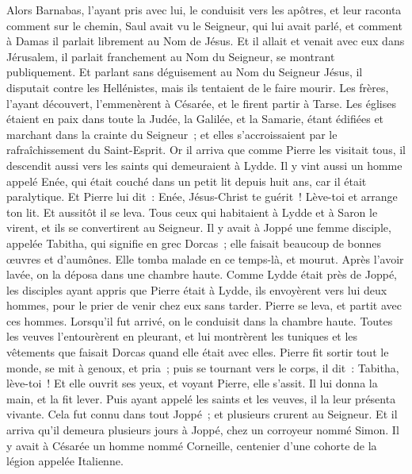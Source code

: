 \begin{multicols}{2}
Alors Barnabas, l'ayant pris avec lui, le conduisit vers les apôtres, et leur raconta comment sur le chemin, Saul avait vu le Seigneur, qui lui avait parlé, et comment à Damas il parlait librement au Nom de Jésus.
Et il allait et venait avec eux dans Jérusalem, il parlait franchement au Nom du Seigneur, se montrant publiquement.
Et parlant sans déguisement au Nom du Seigneur Jésus, il disputait contre les Hellénistes, mais ils tentaient de le faire mourir.
Les frères, l'ayant découvert, l'emmenèrent à Césarée, et le firent partir à Tarse.
Les églises étaient en paix dans toute la Judée, la Galilée, et la Samarie, étant édifiées et marchant dans la crainte du Seigneur~; et elles s'accroissaient par le rafraîchissement du Saint-Esprit.
Or il arriva que comme Pierre les visitait tous, il descendit aussi vers les saints qui demeuraient à Lydde.
Il y vint aussi un homme appelé Enée, qui était couché dans un petit lit depuis huit ans, car il était paralytique.
Et Pierre lui dit~: Enée, Jésus-Christ te guérit~! Lève-toi et arrange ton lit. Et aussitôt il se leva.
Tous ceux qui habitaient à Lydde et à Saron le virent, et ils se convertirent au Seigneur.
Il y avait à Joppé une femme disciple, appelée Tabitha, qui signifie en grec Dorcas~; elle faisait beaucoup de bonnes œuvres et d'aumônes.
Elle tomba malade en ce temps-là, et mourut. Après l'avoir lavée, on la déposa dans une chambre haute.
Comme Lydde était près de Joppé, les disciples ayant appris que Pierre était à Lydde, ils envoyèrent vers lui deux hommes, pour le prier de venir chez eux sans tarder.
Pierre se leva, et partit avec ces hommes. Lorsqu'il fut arrivé, on le conduisit dans la chambre haute. Toutes les veuves l'entourèrent en pleurant, et lui montrèrent les tuniques et les vêtements que faisait Dorcas quand elle était avec elles.
Pierre fit sortir tout le monde, se mit à genoux, et pria~; puis se tournant vers le corps, il dit~: Tabitha, lève-toi~! Et elle ouvrit ses yeux, et voyant Pierre, elle s'assit.
Il lui donna la main, et la fit lever. Puis ayant appelé les saints et les veuves, il la leur présenta vivante.
Cela fut connu dans tout Joppé~; et plusieurs crurent au Seigneur.
Et il arriva qu'il demeura plusieurs jours à Joppé, chez un corroyeur nommé Simon.
\VerseOne{}Il y avait à Césarée un homme nommé Corneille, centenier d'une cohorte de la légion appelée Italienne.

\end{multicols}
